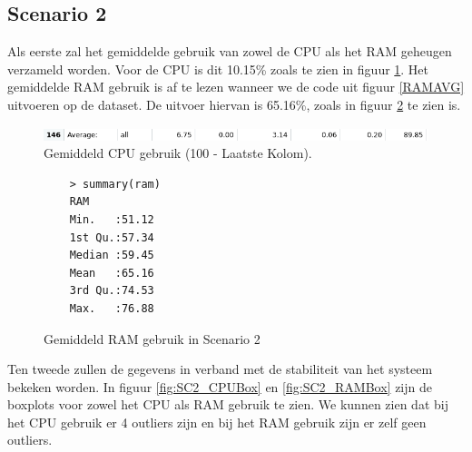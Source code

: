 
\clearpage
\subsection{Scenario 2}
Als eerste zal het gemiddelde gebruik van zowel de CPU als het RAM geheugen verzameld worden. Voor de CPU is dit 10.15\% zoals te zien in figuur \ref{fig:SC2_CPUAVG}. Het gemiddelde RAM gebruik is af te lezen wanneer we de code uit figuur \ref{RAMAVG} uitvoeren op de dataset. De uitvoer hiervan is 65.16\%, zoals in figuur \ref{SC2_RAMAVG} te zien is.
\begin{figure}[h]
	\centering
	\includegraphics[width=\linewidth]{img/SC2_CPUAVG.png}
	\caption{Gemiddeld CPU gebruik (100 - Laatste Kolom).}
	\label{fig:SC2_CPUAVG}
\end{figure}
\begin{figure}[h]
	\centering
	\begin{verbatim} 
	> summary(ram)
	RAM       
	Min.   :51.12  
	1st Qu.:57.34  
	Median :59.45  
	Mean   :65.16  
	3rd Qu.:74.53  
	Max.   :76.88  
	\end{verbatim}
	\caption{Gemiddeld RAM gebruik in Scenario 2}
	\label{SC2_RAMAVG}
\end{figure}

Ten tweede zullen de gegevens in verband met de stabiliteit van het systeem bekeken worden. In figuur \ref{fig:SC2_CPUBox} en \ref{fig:SC2_RAMBox} zijn de boxplots voor zowel het CPU als RAM gebruik te zien. We kunnen zien dat bij het CPU gebruik er 4 outliers zijn en bij het RAM gebruik zijn er zelf geen outliers. 

